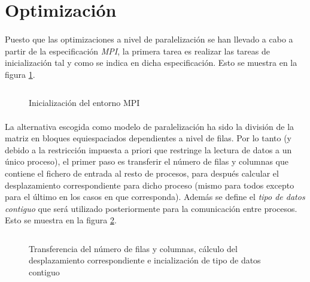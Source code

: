 \documentclass[10pt, a4paper,spanish]{article}
\begin{document}
		\paragraph{}
		\cite{subject:cp}

	\section{Optimización}

		\paragraph{}
		Puesto que las optimizaciones a nivel de paralelización se han llevado a cabo a partir de la especificación \emph{MPI}, la primera tarea es realizar las tareas de inicialización tal y como se indica en dicha especificación. Esto se muestra en la figura \ref{code:init}.

		\begin{figure}[H]
			\centering
			\inputminted{c}{./code/init.c}
			\caption{Inicialización del entorno MPI}
			\label{code:init}
		\end{figure}

		\paragraph{}
		La alternativa escogida como modelo de paralelización ha sido la división de la matriz en bloques equiespaciados dependientes a nivel de filas. Por lo tanto (y debido a la restricción impuesta a priori que restringe la lectura de datos a un único proceso), el primer paso es transferir el número de filas y columnas que contiene el fichero de entrada al resto de procesos, para después calcular el desplazamiento correspondiente para dicho proceso (mismo para todos excepto para el último en los casos en que corresponda). Además se define el \emph{tipo de datos contiguo} que será utilizado posteriormente para la comunicación entre procesos. Esto se muestra en la figura \ref{code:op1}.

		\begin{figure}[H]
			\centering
			\inputminted{c}{./code/op1.c}
			\caption{Transferencia del número de filas y columnas, cálculo del desplazamiento correspondiente e incialización de tipo de datos contiguo}
			\label{code:op1}
		\end{figure}
\end{document}
